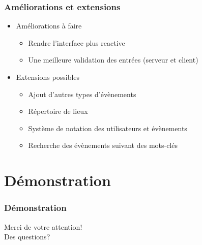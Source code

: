 \documentclass{beamer}
\begin{document}
\begin{frame}
    \frametitle{Améliorations et extensions}
    \begin{itemize}
        \item Améliorations à faire
        \begin{itemize}
            \item Rendre l’interface plus reactive
            \item Une meilleure validation des entrées (serveur et client)
        \end{itemize} \pause
        \item Extensions possibles
        \begin{itemize}
            \item Ajout d'autres types d'évènements
            \item Répertoire de lieux
            \item Système de notation des utilisateurs et évènements
            \item Recherche des évènements suivant des mots-clés
        \end{itemize}
    \end{itemize}
\end{frame}

\section{Démonstration}
\begin{frame}
    \frametitle{Démonstration}
\end{frame}

\begin{frame}
    \begin{center}
        \huge
        Merci de votre attention!\\ \pause
        \vspace{1cm}
        Des questions?
    \end{center}
\end{frame}
\end{document}
